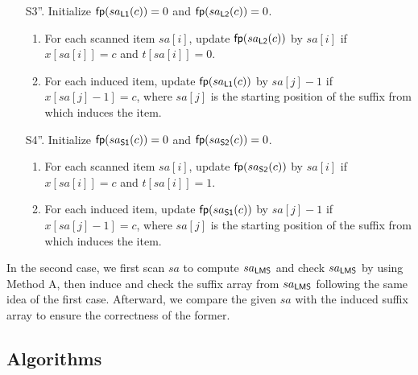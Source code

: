 \documentclass[10pt,journal,compsoc]{IEEEtran}
\begin{document}
	\begin{enumerate}
		
		\item [S3''.] Initialize ${\sf fp}(sa_{\sf L1}(c)) = 0$ and ${\sf fp}(sa_{\sf L2}(c)) = 0$.
		
		\begin{enumerate} [(1)]
			
			\item For each scanned item $sa[i]$, update ${\sf fp}(sa_{\sf L2}(c))$ by $sa[i]$ if $x[sa[i]] = c$ and $t[sa[i]] = 0$.
			
			\item For each induced item, update ${\sf fp}(sa_{\sf L1}(c))$ by $sa[j] - 1$ if $x[sa[j] - 1] = c$, where $sa[j]$ is the starting position of the suffix from which induces the item.
			
		\end{enumerate}
		
		\item [S4''.] Initialize ${\sf fp}(sa_{\sf S1}(c)) = 0$ and ${\sf fp}(sa_{\sf S2}(c)) = 0$.
		
		\begin{enumerate}[(1)]
			
			\item For each scanned item $sa[i]$, update ${\sf fp}(sa_{\sf S2}(c))$ by $sa[i]$ if $x[sa[i]] = c$ and $t[sa[i]] = 1$.
			
			\item For each induced item, update ${\sf fp}(sa_{\sf S1}(c))$ by $sa[j] - 1$ if $x[sa[j] - 1] = c$, where $sa[j]$ is the starting position of the suffix from which induces the item.
			
		\end{enumerate}
		
	\end{enumerate}
	
		\vspace{1ex}  In the second case, we first scan $sa$ to compute $sa_{\sf LMS}$ and check $sa_{\sf LMS}$ by using Method A, then induce and check the suffix array from $sa_{\sf LMS}$ following the same idea of the first case. Afterward, we compare the given $sa$ with the induced suffix array to ensure the correctness of the former.
	
	\subsection{Algorithms} \label{sec:method2:algorithm}
	
\end{document}
